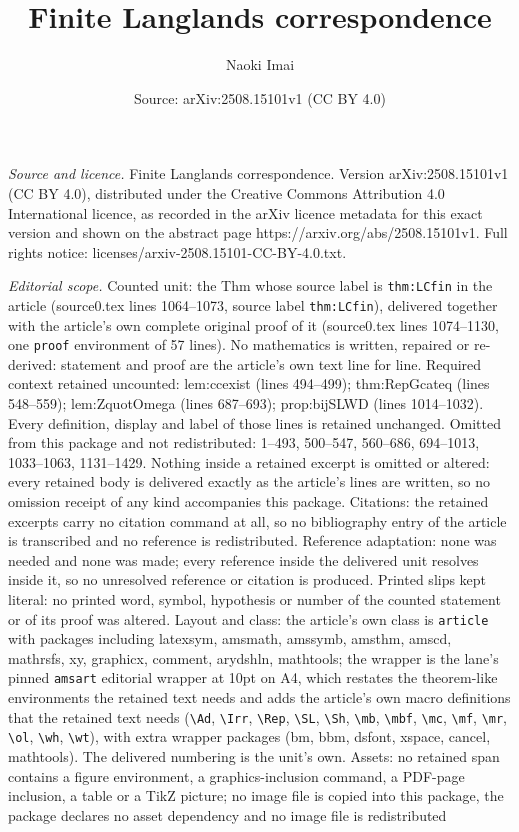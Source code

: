 \documentclass[10pt,a4paper]{amsart}
\title[Finite Langlands correspondence]{Finite Langlands correspondence}
\author{Naoki Imai}
\date{Source: arXiv:2508.15101v1 (CC BY 4.0)}
\begin{document}
\maketitle

\noindent\emph{Source and licence.} Finite Langlands correspondence. Version arXiv:2508.15101v1 (CC BY 4.0), distributed under the Creative Commons Attribution 4.0 International licence, as recorded in the arXiv licence metadata for this exact version and shown on the abstract page https://arxiv.org/abs/2508.15101v1. Full rights notice: licenses/arxiv-2508.15101-CC-BY-4.0.txt.\par\smallskip

\noindent\textit{Editorial scope.} Counted unit: the Thm whose source label is \texttt{thm:LCfin} in the article (source0.tex lines 1064--1073, source label \texttt{thm:LCfin}), delivered together with the article's own complete original proof of it (source0.tex lines 1074--1130, one \texttt{proof} environment of 57 lines). No mathematics is written, repaired or re-derived: statement and proof are the article's own text line for line. Required context retained uncounted: lem:ccexist (lines 494--499); thm:RepGcateq (lines 548--559); lem:ZquotOmega (lines 687--693); prop:bijSLWD (lines 1014--1032). Every definition, display and label of those lines is retained unchanged. Omitted from this package and not redistributed: 1--493, 500--547, 560--686, 694--1013, 1033--1063, 1131--1429. Nothing inside a retained excerpt is omitted or altered: every retained body is delivered exactly as the article's lines are written, so no omission receipt of any kind accompanies this package. Citations: the retained excerpts carry no citation command at all, so no bibliography entry of the article is transcribed and no reference is redistributed. Reference adaptation: none was needed and none was made; every reference inside the delivered unit resolves inside it, so no unresolved reference or citation is produced. Printed slips kept literal: no printed word, symbol, hypothesis or number of the counted statement or of its proof was altered. Layout and class: the article's own class is \texttt{article} with packages including latexsym, amsmath, amssymb, amsthm, amscd, mathrsfs, xy, graphicx, comment, arydshln, mathtools; the wrapper is the lane's pinned \texttt{amsart} editorial wrapper at 10pt on A4, which restates the theorem-like environments the retained text needs and adds the article's own macro definitions that the retained text needs (\texttt{\textbackslash Ad}, \texttt{\textbackslash Irr}, \texttt{\textbackslash Rep}, \texttt{\textbackslash SL}, \texttt{\textbackslash Sh}, \texttt{\textbackslash mb}, \texttt{\textbackslash mbf}, \texttt{\textbackslash mc}, \texttt{\textbackslash mf}, \texttt{\textbackslash mr}, \texttt{\textbackslash ol}, \texttt{\textbackslash wh}, \texttt{\textbackslash wt}), with extra wrapper packages (bm, bbm, dsfont, xspace, cancel, mathtools). The delivered numbering is the unit's own. Assets: no retained span contains a figure environment, a graphics-inclusion command, a PDF-page inclusion, a table or a TikZ picture; no image file is copied into this package, the package declares no asset dependency and no image file is redistributed 
\end{document}
